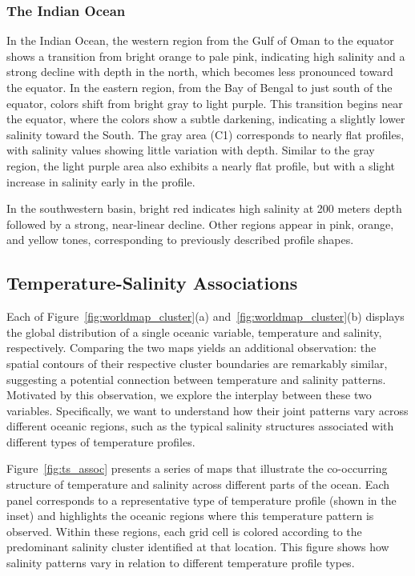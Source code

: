 \documentclass[11pt]{article}
\theoremstyle{plain}
\begin{document}
\subsubsection*{The Indian Ocean}
In the Indian Ocean, the western region from the Gulf of Oman to the equator shows a transition from bright orange to pale pink, indicating high salinity and a strong decline with depth in the north, which becomes less pronounced toward the equator. In the eastern region, from the Bay of Bengal to just south of the equator, colors shift from bright gray to light purple. This transition begins near the equator, where the colors show a subtle darkening, indicating a slightly lower salinity toward the South. The gray area (C1) corresponds to nearly flat profiles, with salinity values showing little variation with depth. Similar to the gray region, the light purple area also exhibits a nearly flat profile, but with a slight increase in salinity early in the profile.

In the southwestern basin, bright red indicates high salinity at 200 meters depth  followed by a strong, near-linear decline. Other regions appear in pink, orange, and yellow tones, corresponding to previously described profile shapes.

\subsection{Temperature-Salinity Associations}

Each of Figure~\ref{fig:worldmap_cluster}(a) and~\ref{fig:worldmap_cluster}(b) displays the global distribution of a single oceanic variable, temperature and salinity, respectively. Comparing the two maps yields an additional observation: the spatial contours of their respective cluster boundaries are remarkably similar, suggesting a potential connection between temperature and salinity patterns. Motivated by this observation, we explore the interplay between these two variables. Specifically, we want to understand how their joint patterns vary across different oceanic regions, such as the typical salinity structures associated with different types of temperature profiles.

Figure~\ref{fig:ts_assoc} presents a series of maps that illustrate the co-occurring structure of temperature and salinity across different parts of the ocean. Each panel corresponds to a representative type of temperature profile (shown in the inset) and highlights the oceanic regions where this temperature pattern is observed. Within these regions, each grid cell is colored according to the predominant salinity cluster identified at that location. This figure shows how salinity patterns vary in relation to different temperature profile types.
\end{document}
